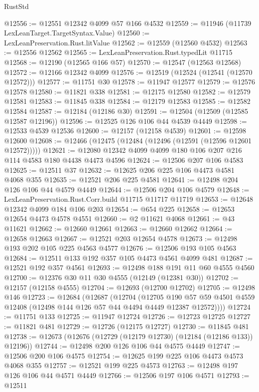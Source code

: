 \begin{lexlean}{RustStd}
\begin{coremodule}
@12556 := @12551 @12342 @4099 @57 @166 @4532
@12559 := @11946 (@11739 LexLeanTarget.TargetSyntax.Value)
@12560 := LexLeanPreservation.Rust.litValue
@12562 := @12559 (@12560 @4532)
@12563 := @12556 @12562
@12565 := LexLeanPreservation.Rust.typedLit @11715
@12568 := @12190 (@12565 @166 @57)
@12570 := @12547 (@12563 @12568)
@12572 := @12166 @12342 @4099
@12576 := @12519 (@12524 (@12541 (@12570 @12572)))
@12577 := @11751 @30
@12578 := @11947 @12577
@12579 := @12576 @12578
@12580 := @11821 @338
@12581 := @12175 @12580
@12582 := @12579 @12581
@12583 := @11845 @338
@12584 := @12179 @12583
@12585 := @12582 @12584
@12587 := @12184 (@12186 @30)
@12591 := @12504 (@12509 (@12585 @12587 @12196))
@12596 := @12525 @126 @106 @44 @4539 @4449
@12598 := @12533 @4539 @12536
@12600 := @12157 (@12158 @4539)
@12601 := @12598 @12600
@12608 := @12466 (@12475 (@12484 (@12496 (@12591 (@12596 @12601 @12572)))))
@12621 := @12080 @12342 @4099 @4099 @180 @106 @207 @216 @114 @4583 @180 @4438 @4473 @4596
@12624 := @12506 @207 @106 @4583
@12625 := @12511 @37
@12632 := @12625 @206 @225 @106 @4473 @4581 @4068 @355
@12635 := @12521 @206 @225 @4581
@12641 := @12498 @204 @126 @106 @44 @4579 @4449
@12644 := @12506 @204 @106 @4579
@12648 := LexLeanPreservation.Rust.Corr.build @11715 @11717 @11719
@12653 := @12648 @12342 @4099 @184 @106 @203
@12654 := @654 @225
@12658 := @12653 @12654 @4473 @4578 @4551
@12660 := @2 @11621 @4068
@12661 := @43 @11621
@12662 := @12660 @12661
@12663 := @12660 @12662
@12664 := @12658 @12663
@12667 := @12521 @203 @12654 @4578
@12673 := @12498 @193 @202 @105 @225 @4563 @4577
@12676 := @12506 @193 @105 @4563
@12684 := @12511 @133 @192 @357 @105 @4473 @4561 @4099 @481
@12687 := @12521 @192 @357 @4561
@12693 := @12498 @188 @191 @11 @60 @4555 @4560
@12700 := @12376 @30 @11 @30 @4555 (@12149 (@12381 @30))
@12702 := @12157 (@12158 @4555)
@12704 := @12693 (@12700 @12702)
@12705 := @12498 @146
@12723 := @12684
    (@12687
      (@12704
        (@12705
          @190
          @57
          @59
          @4501
          @4559
          @12408
          (@12498 @144 @126 @57 @44 @4494 @4449 @12387 @12572))))
@12724 := @11751 @133
@12725 := @11947 @12724
@12726 := @12723 @12725
@12727 := @11821 @481
@12729 := @12726 (@12175 @12727)
@12730 := @11845 @481
@12738 := @12673 (@12676 (@12729 (@12179 @12730) (@12184 (@12186 @133)) @12196))
@12744 := @12498 @200 @126 @106 @44 @4575 @4449
@12747 := @12506 @200 @106 @4575
@12754 := @12625 @199 @225 @106 @4473 @4573 @4068 @355
@12757 := @12521 @199 @225 @4573
@12763 := @12498 @197 @126 @106 @44 @4571 @4449
@12766 := @12506 @197 @106 @4571
@12793 := @12511

\end{coremodule}
\end{lexlean}
